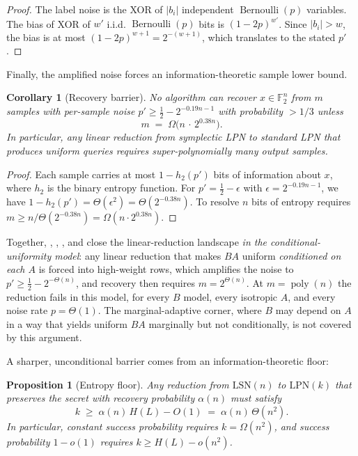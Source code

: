 \documentclass[11pt,a4paper]{article}
\theoremstyle{plain}
\newtheorem{corollary}[theorem]{Corollary}
\newtheorem{proposition}[theorem]{Proposition}
\theoremstyle{definition}
\newcommand{\F}{\mathbb{F}}
\begin{document}
\begin{proof}
The label noise is the XOR of $|b_i|$ independent $\operatorname{Bernoulli}(p)$ variables.  The bias of XOR of $w'$ i.i.d. $\operatorname{Bernoulli}(p)$ bits is $(1-2p)^{w'}$.  Since $|b_i|>w$, the bias is at most $(1-2p)^{w+1}=2^{-(w+1)}$, which translates to the stated $p'$.
\end{proof}

Finally, the amplified noise forces an information-theoretic sample lower bound.

\begin{corollary}[Recovery barrier]
\label{cor:recovery-barrier}
No algorithm can recover $x\in\F_2^{n}$ from $m$ samples with per-sample noise $p'\ge \tfrac12-2^{-0.19n-1}$ with probability $>1/3$ unless
\[
m \;=\; \Omega\bigl(n\,\cdot\,2^{0.38n}\bigr).
\]
In particular, any linear reduction from symplectic LPN to standard LPN that produces uniform queries requires super-polynomially many output samples.
\end{corollary}

\begin{proof}
Each sample carries at most $1-h_2(p')$ bits of information about $x$, where $h_2$ is the binary entropy function.  For $p'=\tfrac12-\epsilon$ with $\epsilon=2^{-0.19n-1}$, we have $1-h_2(p')=\Theta(\epsilon^2)=\Theta(2^{-0.38n})$.  To resolve $n$ bits of entropy requires $m\ge n/\Theta(2^{-0.38n})=\Omega(n\cdot 2^{0.38n})$.
\end{proof}

Together, , , , and  close the linear-reduction landscape \emph{in the conditional-uniformity model}: any linear reduction that makes $BA$ uniform \emph{conditioned on each $A$} is forced into high-weight rows, which amplifies the noise to $p'\ge \tfrac12-2^{-\Theta(n)}$, and recovery then requires $m=2^{\Theta(n)}$.  At $m=\operatorname{poly}(n)$ the reduction fails in this model, for every $B$ model, every isotropic $A$, and every noise rate $p=\Theta(1)$.  The marginal-adaptive corner, where $B$ may depend on $A$ in a way that yields uniform $BA$ marginally but not conditionally, is not covered by this argument.

A sharper, unconditional barrier comes from an information-theoretic floor:

\begin{proposition}[Entropy floor]
\label{prop:entropy-floor}
Any reduction from $\mathrm{LSN}(n)$ to $\mathrm{LPN}(k)$ that preserves the secret with recovery probability $\alpha(n)$ must satisfy
\[
k \;\geq\; \alpha(n)\,H(L) - O(1) \;=\; \alpha(n)\,\Theta(n^2).
\]
In particular, constant success probability requires $k=\Omega(n^2)$, and success probability $1-o(1)$ requires $k \geq H(L)-o(n^2)$.
\end{proposition}
\end{document}
